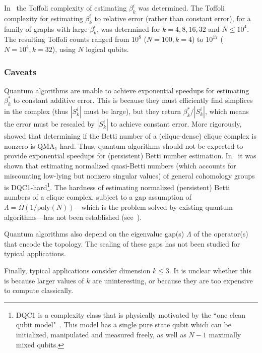 \begin{refsection}
In~\cite{berry2022quantifyingTDA} the Toffoli complexity of estimating $\beta_k^i$ was determined. The Toffoli complexity for estimating $\beta_k^i$ to relative error (rather than constant error), for a family of graphs with large $\beta_k^i$, was determined for $k=4,8,16,32$ and $N \leq 10^4$. The resulting Toffoli counts ranged from $10^8$ ($N=100, k=4$) to $10^{17}$ ($N=10^4, k=32$), using $N$ logical qubits. 




\subsubsection*{Caveats}
Quantum algorithms are unable to achieve exponential speedups for estimating $\beta_k^*$ to constant additive error. This is because they must efficiently find simplices in the complex (thus $|S_k^i|$ must be large), but they return $\beta_k^*/|S_k^i|$, which means the error must be rescaled by $|S_k^i|$ to achieve constant error. More rigorously,~\cite{crichigno2022clique} showed that determining if the Betti number of a (clique-dense) clique complex
is nonzero is QMA$_1$-hard. Thus, quantum algorithms should not be expected to provide exponential speedups for (persistent) Betti number estimation. In~\cite{cade2021complexity} it was shown that estimating normalized quasi-Betti numbers (which accounts for miscounting low-lying but nonzero singular values) of general cohomology groups is DQC1-hard\footnote{DQC1 is a complexity class that is physically motivated by the ``one clean qubit model"~\cite{knill1998DQC1}. This model has a single pure state qubit which can be initialized, manipulated and measured freely, as well as $N-1$ maximally mixed qubits.}. The hardness of estimating normalized (persistent) Betti numbers of a clique complex, subject to a gap assumption of $\Lambda = \Omega(1/\mathrm{poly}(N))$---which is the problem solved by existing quantum algorithms---has not been established (see~\cite[Sec.~1.1]{cade2021complexity}).


Quantum algorithms also depend on the eigenvalue gap(s) $\Lambda$ of the operator(s) that encode the topology. The scaling of these gaps has not been studied for typical applications. 

Finally, typical applications consider dimension $k \leq 3$. It is unclear whether this is because larger values of $k$ are uninteresting, or because they are too expensive to compute classically. 






\end{refsection}
